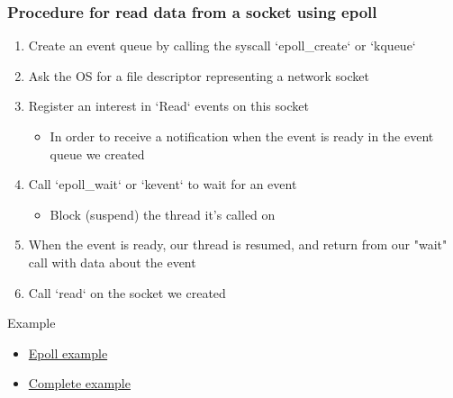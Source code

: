 \begin{frame}[fragile]
    \frametitle{Procedure for read data from a socket using epoll}
% 
% 
% 
    \begin{enumerate}
        \item Create an event queue by calling the syscall `epoll\_create` or `kqueue`
        \item Ask the OS for a file descriptor representing a network socket
        \item Register an interest in `Read` events on this socket
    	\begin{itemize}
    	    \item In order to receive a notification when the event is ready in the event queue we created
    	\end{itemize}
        \item Call `epoll\_wait` or `kevent` to wait for an event
    	\begin{itemize}
    	    \item Block (suspend) the thread it's called on
    	\end{itemize}
        \item When the event is ready, our thread is resumed, and return from our "wait" call with data about the event
        \item Call `read` on the socket we created
    \end{enumerate}
% 
{\color{red}Example}
% 
    \begin{itemize}
        \item \href{http://man7.org/linux/man-pages/man7/epoll.7.html}{Epoll example}
        \item \href{https://www.suchprogramming.com/epoll-in-3-easy-steps/}{Complete example}
    \end{itemize}

\end{frame}
